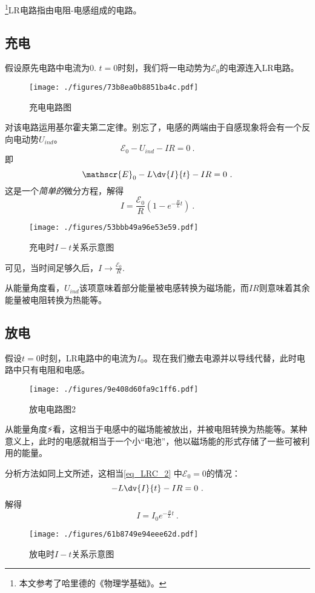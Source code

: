 

\footnote{本文参考了哈里德的《物理学基础》。}LR电路指由电阻-电感组成的电路。

\subsection{充电}
假设原先电路中电流为$0$. $t=0$时刻，我们将一电动势为$\mathscr{E}_0$的电源连入LR电路。
\begin{figure}[ht]
\centering
\texttt{[image: ./figures/73b8ea0b8851ba4c.pdf]}
\caption{充电电路图} \label{fig_LRC_1}
\end{figure}

对该电路运用基尔霍夫第二定律。别忘了，电感的两端由于自感现象将会有一个反向电动势$U_{ind}$。
$$
\mathscr{E}_0 - U_{ind} - IR = 0~.
$$
即
\begin{equation}\label{eq_LRC_2}
\mathscr{E}_0 - L\dv{I}{t} - IR = 0~.
\end{equation}
这是一个\textsl{简单的}微分方程，解得
\begin{equation}\label{eq_LRC_1}
I = \frac{\mathscr{E}_0}{R} (1-e^{-\frac{R}{L}t})~.
\end{equation}

\begin{figure}[ht]
\centering
\texttt{[image: ./figures/53bbb49a96e53e59.pdf]}
\caption{充电时$I-t$关系示意图} \label{fig_LRC_3}
\end{figure}
可见，当时间足够久后，$I\to\frac{\mathscr{E_0}}{R}$.

从能量角度看，$U_{ind}$该项意味着部分能量被电感转换为磁场能，而$IR$则意味着其余能量被电阻转换为热能等。

\subsection{放电}
假设$t=0$时刻，LR电路中的电流为$I_0$。现在我们撤去电源并以导线代替，此时电路中只有电阻和电感。
\begin{figure}[ht]
\centering
\texttt{[image: ./figures/9e408d60fa9c1ff6.pdf]}
\caption{放电电路图2} \label{fig_LRC_2}
\end{figure}
从能量角度⚡️看，这相当于电感中的磁场能被放出，并被电阻转换为热能等。某种意义上，此时的电感就相当于一个小“电池”，他以磁场能的形式存储了一些可被利用的能量。

分析方法如同上文所述，这相当\autoref{eq_LRC_2}  中$\mathscr{E}_0=0$的情况：
\begin{equation}
- L\dv{I}{t} - IR = 0~.
\end{equation}
解得
\begin{equation}
I = I_0 e^{-\frac{R}{L}t}~.
\end{equation}
\begin{figure}[ht]
\centering
\texttt{[image: ./figures/61b8749e94eee62d.pdf]}
\caption{放电时$I-t$关系示意图} \label{fig_LRC_4}
\end{figure}
